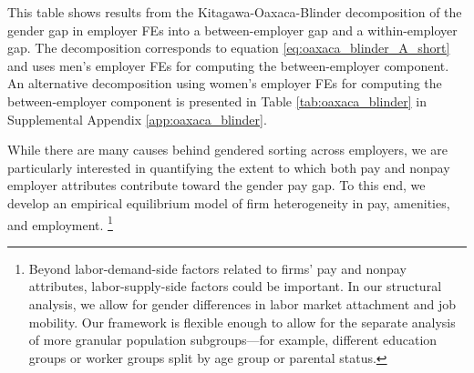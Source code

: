 %
\begin{table}[htbp!]
    \caption{Kitagawa-Oaxaca-Blinder decompositions of the gender gap in employer FEs}
    \label{tab:oaxaca_blinder_short}
    \resizebox{\textwidth}{!}{%
    
    }
    \begin{tablenotes}
        This table shows results from the Kitagawa-Oaxaca-Blinder decomposition of the gender gap in employer FEs into a between-employer gap and a within-employer gap. The decomposition corresponds to equation \eqref{eq:oaxaca_blinder_A_short} and uses men's employer FEs for computing the between-employer component. An alternative decomposition using women's employer FEs for computing the between-employer component is presented in Table \ref{tab:oaxaca_blinder} in Supplemental Appendix \ref{app:oaxaca_blinder}.
    \end{tablenotes}
    \begin{tablenotes}[Source]
        \sourcedata
    \end{tablenotes}
\end{table}
%

While there are many causes behind gendered sorting across employers, we are particularly interested in quantifying the extent to which both pay and nonpay employer attributes contribute toward the gender pay gap. To this end, we develop an empirical equilibrium model of firm heterogeneity in pay, amenities, and employment.%
%
\footnote{Beyond labor-demand-side factors related to firms' pay and nonpay attributes, labor-supply-side factors could be important. In our structural analysis, we allow for gender differences in labor market attachment and job mobility. Our framework is flexible enough to allow for the separate analysis of more granular population subgroups---for example, different education groups or worker groups split by age group or parental status.} %
%
